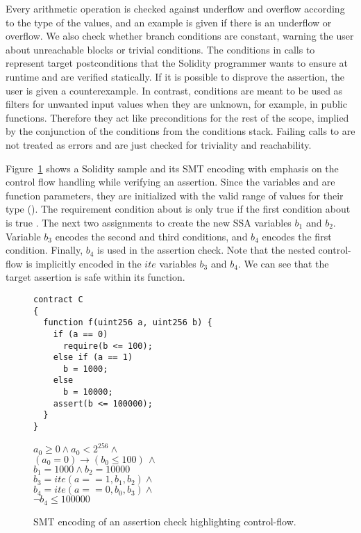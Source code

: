 Every arithmetic operation is checked against underflow and overflow according
to the type of the values, and an example is given if there is an underflow or
overflow.
%
We also check whether branch conditions are constant, warning the user about
unreachable blocks or trivial conditions.
%
The conditions in calls to  represent target postconditions that the
Solidity programmer wants to ensure at runtime and are verified statically.
%
If it is possible to disprove the assertion, the user is given a
counterexample.
%
In contrast,  conditions are meant to be used as
filters for unwanted input values when they are unknown, for example, in public
functions.
%
Therefore they act like preconditions for the rest of the scope, implied by the
conjunction of the conditions from the conditions stack.
%
Failing calls to  are not treated as errors and
are just checked for triviality and reachability.
%

Figure~\ref{figure:solidity_encoding_1} shows a Solidity sample and its SMT
encoding with emphasis on the control flow handling while verifying an assertion.
%
Since the variables  and  are function parameters, they
are initialized with the valid range of values for their type ().
%
The requirement condition about  is only true if the first condition
about  is true .
%
The next two assignments to  create the new SSA variables
$b_1$ and $b_2$.
%
Variable $b_3$ encodes the second and third conditions, and $b_4$
encodes the first condition.
%
Finally, $b_4$ is used in the assertion check.
%
Note that the nested control-flow is implicitly encoded in the $ite$
variables $b_3$ and $b_4$.
%
We can see that the target assertion is safe within its function.

\begin{figure}
\label{figure:solidity_encoding_1}
\noindent\begin{minipage}{.48\textwidth}
\begin{verbatim}
contract C
{
  function f(uint256 a, uint256 b) {
    if (a == 0)
      require(b <= 100);
    else if (a == 1)
      b = 1000;
    else
      b = 10000;
    assert(b <= 100000);
  }
}
\end{verbatim}
\end{minipage}\hfill
\begin{minipage}{.48\textwidth}
$a_0 \ge 0 \land a_0 < 2^{256}  \land \phantom{x}$\\
$(a_0 = 0) \rightarrow (b_0 \le 100) \, \land$\\
$b_1 = 1000 \land b_2 = 10000$\\
$b_3 = ite(a == 1, b_1, b_2) \land \phantom{x}$\\
$b_4 = ite(a == 0, b_0, b_3) \land \phantom{x}$\\
$\neg b_4 \le 100000$
\end{minipage}
\caption{SMT encoding of an assertion check highlighting control-flow.}
\end{figure}

